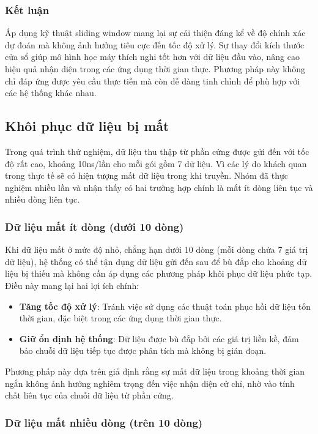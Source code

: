 \subsubsection{Kết luận}

Áp dụng kỹ thuật sliding window mang lại sự cải thiện đáng kể về độ chính xác dự đoán mà không ảnh hưởng tiêu cực đến tốc độ xử lý. Sự thay đổi kích thước cửa sổ giúp mô hình học máy thích nghi tốt hơn với dữ liệu đầu vào, nâng cao hiệu quả nhận diện trong các ứng dụng thời gian thực. Phương pháp này không chỉ đáp ứng được yêu cầu thực tiễn mà còn dễ dàng tinh chỉnh để phù hợp với các hệ thống khác nhau. 


\subsection{Khôi phục dữ liệu bị mất}

Trong quá trình thử nghiệm, dữ liệu thu thập từ phần cứng được gửi đến với tốc độ rất cao, khoảng 10ns/lần cho mỗi gói gồm 7 dữ liệu. Vì các lý do khách quan trong thực tế sẽ có hiện tượng mất dữ liệu trong khi truyền. Nhóm đã thực nghiệm nhiều lần và nhận thấy có hai trường hợp chính là mất ít dòng liên tục và nhiều dòng liên tục.

\subsubsection{Dữ liệu mất ít dòng (dưới 10 dòng)}

Khi dữ liệu mất ở mức độ nhỏ, chẳng hạn dưới 10 dòng (mỗi dòng chứa 7 giá trị dữ liệu), hệ thống có thể tận dụng dữ liệu gửi đến sau để bù đắp cho khoảng dữ liệu bị thiếu mà không cần áp dụng các phương pháp khôi phục dữ liệu phức tạp. Điều này mang lại hai lợi ích chính:
\begin{itemize}
    \item \textbf{Tăng tốc độ xử lý}: Tránh việc sử dụng các thuật toán phục hồi dữ liệu tốn thời gian, đặc biệt trong các ứng dụng thời gian thực.
    \item \textbf{Giữ ổn định hệ thống}: Dữ liệu được bù đắp bởi các giá trị liền kề, đảm bảo chuỗi dữ liệu tiếp tục được phân tích mà không bị gián đoạn.
\end{itemize}

Phương pháp này dựa trên giả định rằng sự mất dữ liệu trong khoảng thời gian ngắn không ảnh hưởng nghiêm trọng đến việc nhận diện cử chỉ, nhờ vào tính chất liên tục của chuỗi dữ liệu từ phần cứng.

\subsubsection{Dữ liệu mất nhiều dòng (trên 10 dòng)}

